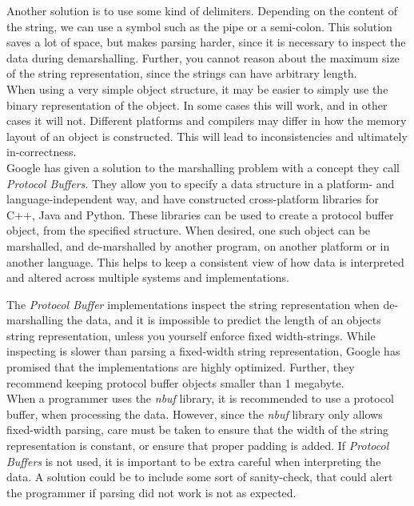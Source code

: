 \documentclass[a4paper]{article}
\newcommand{\nbuf}{\textit{nbuf} }
\begin{document}
Another solution is to use some kind of delimiters. Depending on the content of the string, we can use a symbol such as the pipe or a semi-colon. This solution saves a lot of space, but makes parsing harder, since it is necessary to inspect the data during demarshalling. Further, you cannot reason about the maximum size of the string representation, since the strings can have arbitrary length.\\

When using a very simple object structure, it may be easier to simply use the binary representation of the object. In some cases this will work, and in other cases it will not. Different platforms and compilers may differ in how the memory layout of an object is constructed. This will lead to inconsistencies and ultimately in-correctness.\\

Google has given a solution to the marshalling problem with a concept they call \textit{Protocol Buffers}\cite{protobuf}. They allow you to specify a data structure in a platform- and language-independent way, and have constructed cross-platform libraries for C++, Java and Python. These libraries can be used to create a protocol buffer object, from the specified structure. When desired, one such object can be marshalled, and de-marshalled by another program, on another platform or in another language. This helps to keep a consistent view of how data is interpreted and altered across multiple systems and implementations.

The \textit{Protocol Buffer} implementations inspect the string representation when de-marshalling the data, and it is impossible to predict the length of an objects string representation, unless you yourself enforce fixed width-strings. While inspecting is slower than parsing a fixed-width string representation, Google has promised that the implementations are highly optimized. Further, they recommend keeping protocol buffer objects smaller than 1 megabyte.\\

When a programmer uses the \nbuf library, it is recommended to use a protocol buffer, when processing the data. However, since the \nbuf library only allows fixed-width parsing, care must be taken to ensure that the width of the string representation is constant, or ensure that proper padding is added. If \textit{Protocol Buffers} is not used, it is important to be extra careful when interpreting the data. A solution could be to include some sort of sanity-check, that could alert the programmer if parsing did not work is not as expected.
\end{document}
